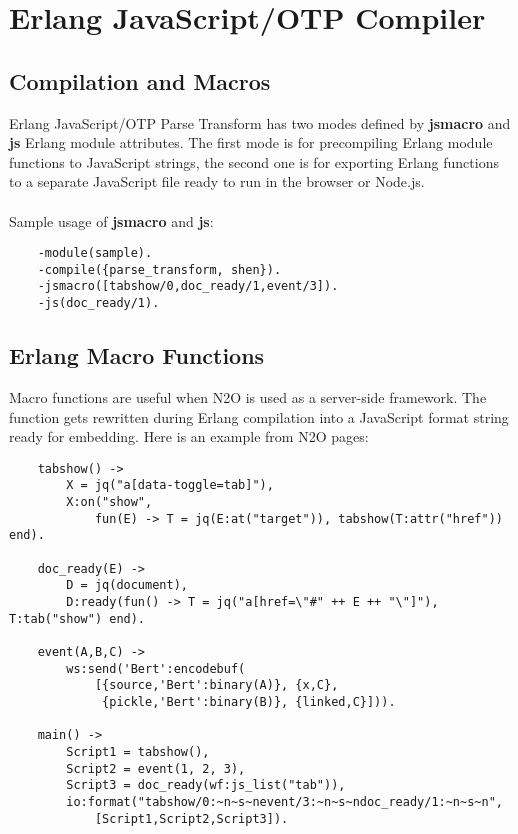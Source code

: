\section{Erlang JavaScript/OTP Compiler}

\subsection{Compilation and Macros}
Erlang JavaScript/OTP Parse Transform has two modes defined
by {\bf \-jsmacro} and {\bf \-js} Erlang module attributes.
The first mode is for precompiling Erlang module functions
to JavaScript strings, the second one is for exporting Erlang functions
to a separate JavaScript file ready to run in the browser or Node.js.

\paragraph{}
Sample usage of {\bf \-jsmacro} and {\bf \-js}:

\vspace{1\baselineskip}
\begin{lstlisting}
    -module(sample).
    -compile({parse_transform, shen}).
    -jsmacro([tabshow/0,doc_ready/1,event/3]).
    -js(doc_ready/1).
\end{lstlisting}

\subsection{Erlang Macro Functions}
Macro functions are useful when N2O is used as a server-side framework.
The function gets rewritten during Erlang compilation into a JavaScript format
string ready for embedding. Here is an example from N2O pages:

\begin{lstlisting}
    tabshow() ->
        X = jq("a[data-toggle=tab]"),
        X:on("show", 
            fun(E) -> T = jq(E:at("target")), tabshow(T:attr("href")) end).

    doc_ready(E) ->
        D = jq(document),
        D:ready(fun() -> T = jq("a[href=\"#" ++ E ++ "\"]"), T:tab("show") end).

    event(A,B,C) ->
        ws:send('Bert':encodebuf(
            [{source,'Bert':binary(A)}, {x,C},
             {pickle,'Bert':binary(B)}, {linked,C}])).

    main() ->
        Script1 = tabshow(),
        Script2 = event(1, 2, 3),
        Script3 = doc_ready(wf:js_list("tab")),
        io:format("tabshow/0:~n~s~nevent/3:~n~s~ndoc_ready/1:~n~s~n",
            [Script1,Script2,Script3]).
\end{lstlisting}
\vspace{1\baselineskip}


